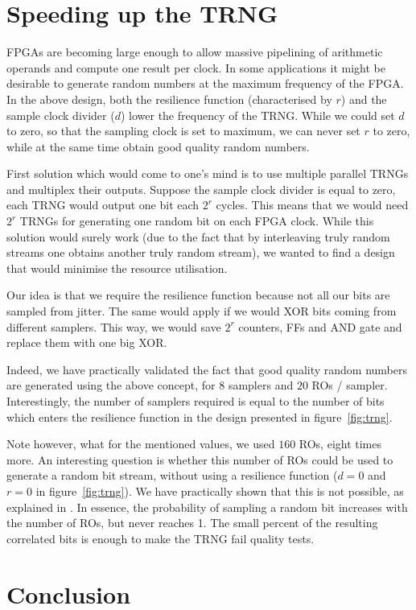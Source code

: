 \documentclass[conference]{IEEEtran}
\begin{document}
\section{Speeding up the TRNG}
FPGAs are becoming large enough to allow massive pipelining of arithmetic operands and compute one result per clock. In some applications it might be desirable to generate random numbers at the maximum frequency of the FPGA. In the above design, both the resilience function (characterised by $r$) and the sample clock divider ($d$) lower the frequency of the TRNG. While we could set $d$ to zero, so that the sampling clock is set to maximum, we can never set $r$ to zero, while at the same time obtain good quality random numbers.

First solution which would come to one's mind is to use multiple parallel TRNGs and multiplex their outputs. Suppose the sample clock divider is equal to zero, each TRNG would output one bit each $2^r$ cycles. This means that we would need $2^r$ TRNGs for generating one random bit on each FPGA clock. While this solution would surely work (due to the fact that by interleaving truly random streams one obtains another truly random stream), we wanted to find a design that would minimise the resource utilisation.

Our idea is that we require the resilience function because not all our bits are sampled from jitter. The same would apply if we would XOR bits coming from different samplers. This way, we would save $2^r$ counters, FFs and AND gate and replace them with one big XOR.

Indeed, we have practically validated the fact that good quality random numbers are generated using the above concept, for $8$ samplers and $20$ ROs / sampler. Interestingly, the number of samplers required is equal to the number of bits which enters the resilience function in the design presented in figure~\ref{fig:trng}.

\newpage Note however, what for the mentioned values, we used $160$ ROs, eight times more. An interesting question is whether this number of ROs could be used to generate a random bit stream, without using a resilience function ($d=0$ and $r=0$ in figure~\ref{fig:trng}). We have practically shown that this is not possible, as explained in \cite{Sc06}. In essence, the probability of sampling a random bit increases with the number of ROs, but never reaches 1. The small percent of the resulting correlated bits is enough to make the TRNG fail quality tests.

\section{Conclusion}
\end{document}
